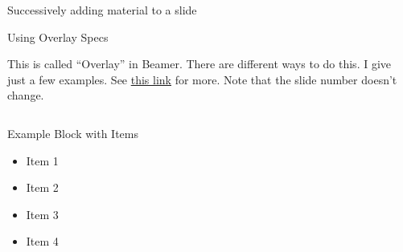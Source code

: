 \documentclass[aspectratio=169]{beamer}
\begin{document}
\begin{frame}{Successively adding material to a slide}

  \begin{block}{Using Overlay Specs}
  
  This is called ``Overlay'' in Beamer.
  There are different ways to do this. 
  I give just a few examples.
  See \href{https://www.overleaf.com/learn/latex/Beamer\_Presentations\%3A\_A\_Tutorial\_for\_Beginners\_(Part\_4)\%E2\%80\%94Overlay\_Specifications}{this link} for more.
  Note that the slide number doesn't change.
  \end{block}
  

  \begin{columns}[T]


    \centering
    \vspace{-0.5\baselineskip}
    \begin{block}{Example Block with Items}
      \begin{itemize} 
      \item<1-> Item 1
      \item<2,4> Item 2
      \item<3> Item 3
      \item<4-> Item 4
    \end{itemize}
    \end{block}


    \centering
    \vspace{-0.5\baselineskip}
  



  \end{columns}

\end{frame}
\end{document}
